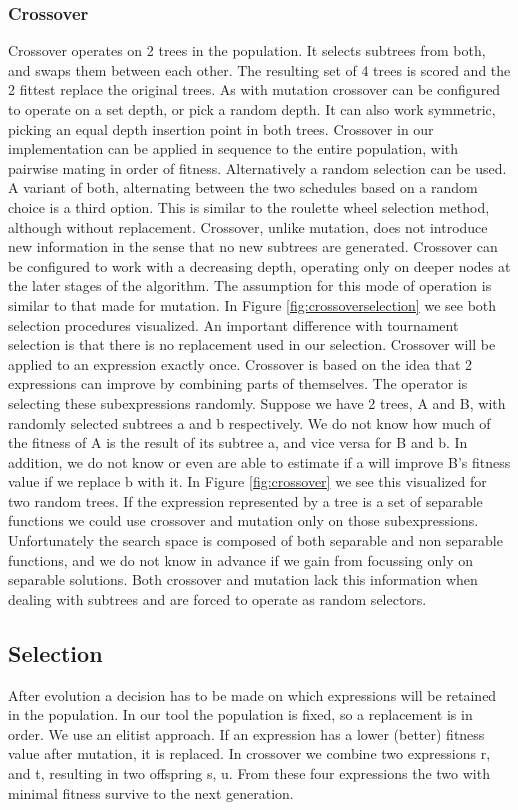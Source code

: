 \subsubsection{Crossover}
Crossover operates on 2 trees in the population. It selects subtrees from both, and swaps them between each other. The resulting set of 4 trees is scored and the 2 fittest replace the original trees. As with mutation crossover can be configured to operate on a set depth, or pick a random depth. It can also work symmetric, picking an equal depth insertion point in both trees.
Crossover in our implementation can be applied in sequence to the entire population, with pairwise mating in order of fitness. Alternatively a random selection can be used. A variant of both, alternating between the two schedules based on a random choice is a third option. This is similar to the roulette wheel selection method, although without replacement. 
Crossover, unlike mutation, does not introduce new information in the sense that no new subtrees are generated. 
Crossover can be configured to work with a decreasing depth, operating only on deeper nodes at the later stages of the algorithm. The assumption for this mode of operation is similar to that made for mutation. 
In Figure \ref{fig:crossoverselection} we see both selection procedures visualized. An important difference with tournament selection is that there is no replacement used in our selection. Crossover will be applied to an expression exactly once.
Crossover is based on the idea that 2 expressions can improve by combining parts of themselves. The operator is selecting these subexpressions randomly. Suppose we have 2 trees, A and B, with randomly selected subtrees a and b respectively. We do not know how much of the fitness of A is the result of its subtree a, and vice versa for B and b. In addition, we do not know or even are able to estimate if a will improve B's fitness value if we replace b with it. In Figure \ref{fig:crossover} we see this visualized for two random trees.
If the expression represented by a tree is a set of separable functions we could use crossover and mutation only on those subexpressions. Unfortunately the search space is composed of both separable and non separable functions, and we do not know in advance if we gain from focussing only on separable solutions. Both crossover and mutation lack this information when dealing with subtrees and are forced to operate as random selectors.

\subsection{Selection}
After evolution a decision has to be made on which expressions will be retained in the population. In our tool the population is fixed, so a replacement is in order. We use an elitist approach. If an expression has a lower (better) fitness value after mutation, it is replaced. 
In crossover we combine two expressions r, and t, resulting in two offspring s, u. 
From these four expressions the two with minimal fitness survive to the next generation.

